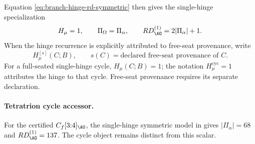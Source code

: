 Equation \eqref{eq:branch-hinge-rd-symmetric} then gives the single-hinge specialization
\begin{equation}
H_\mu=1,
\qquad
\Pi_\Omega=\Pi_\alpha,
\qquad
RD^{(1)}_{\AO}=2|\Pi_\alpha|+1.
\label{eq:single-hinge-symmetric-fixture}
\end{equation}
When the hinge recurrence is explicitly attributed to free-seat provenance, write
\begin{equation}
H_\mu^{[s]}(C;B),
\qquad
s(C)=\text{declared free-seat provenance of }C.
\label{eq:free-seat-hinge-provenance}
\end{equation}
For a full-seated single-hinge cycle, \(H_\mu(C;B)=1\); the
notation \(H_\mu^{\mathrm{cyc}}=1\) attributes the hinge to that cycle.
Free-seat provenance requires its separate declaration.

\paragraph{Tetratrion cycle accessor.}
For the certified \(C_f[3{:}4]_{\AO}\), the single-hinge symmetric model in
 gives \(\lvert\Pi_\alpha\rvert=68\) and
\(RD^{(1)}_{\AO}=137\). The cycle object remains distinct from this scalar.

